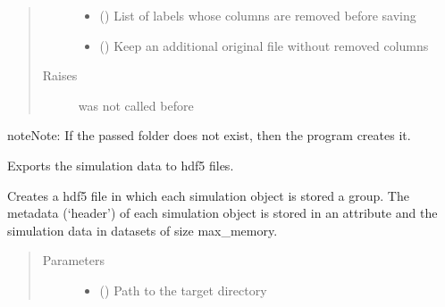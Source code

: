 \documentclass[letterpaper,10pt,english]{sphinxmanual}
\begin{document}
\begin{fulllineitems}
\begin{fulllineitems}
\begin{quote}
\begin{description}
\begin{itemize}
\item {} 
\sphinxAtStartPar
{} (\sphinxstyleliteralemphasis{\sphinxupquote{{[}}}\sphinxstyleliteralemphasis{\sphinxupquote{{]}}}\sphinxstyleliteralemphasis{\sphinxupquote{, }}) \textendash{} List of labels whose columns are removed before saving

\item {} 
\sphinxAtStartPar
{} (\sphinxstyleliteralemphasis{\sphinxupquote{, }}) \textendash{} Keep an additional original file without removed columns

\end{itemize}

\item[{Raises}] \leavevmode
\sphinxAtStartPar
{} \textendash{}  was not called before

\end{description}\end{quote}

\begin{sphinxadmonition}{note}{Note:}
\sphinxAtStartPar
If the passed folder does not exist, then the program creates it.
\end{sphinxadmonition}

\end{fulllineitems}


\begin{fulllineitems}
\label{\detokenize{source/API/api:environment.Environment.data_to_hdf5}}
\sphinxAtStartPar
Exports the simulation data to hdf5 files.

\sphinxAtStartPar
Creates a hdf5 file in which each simulation object is stored a group. The metadata (‘header’) of each
simulation object is stored in an attribute and the simulation data in datasets of size max\_memory.
\begin{quote}\begin{description}
\item[{Parameters}] \leavevmode\begin{itemize}
\item {} 
\sphinxAtStartPar
{} () \textendash{} Path to the target directory


\end{itemize}
\end{description}
\end{quote}
\end{fulllineitems}
\end{fulllineitems}
\end{document}
